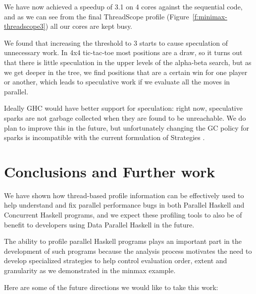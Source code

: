 \documentclass[twocolumn,9pt]{sigplanconf}
\let\cite=\citep
\begin{document}
We have now achieved a speedup of 3.1 on 4 cores against the
sequential code, and as we can see from the final ThreadScope profile
(Figure~\ref{f:minimax-threadscope3}) all our cores are kept busy.

We found that increasing the threshold to 3 starts to cause
speculation of unnecessary work.  In 4x4 tic-tac-toe most positions
are a draw, so it turns out that there is little speculation in the
upper levels of the alpha-beta search, but as we get deeper in the
tree, we find positions that are a certain win for one player or
another, which leads to speculative work if we evaluate all the moves
in parallel.  

Ideally GHC would have better support for speculation: right now,
speculative sparks are not garbage collected when they are found to be
unreachable.  We do plan to improve this in the future, but
unfortunately changing the GC policy for sparks is incompatible with
the current formulation of Strategies \cite{multicore-ghc}.







\section{Conclusions and Further work}
\label{s:conclusion}
We have shown how thread-based profile information can be effectively
used to help understand and fix parallel performance bugs in both
Parallel Haskell and Concurrent Haskell programs, and we expect these
profiling tools to also be of benefit to developers using Data
Parallel Haskell in the future.

The ability to profile parallel Haskell programs plays an important
part in the development of such programs because the analysis
process motivates the need to develop specialized strategies to
help control evaluation order, extent and granularity as we demonstrated in
the minmax example.

Here are some of the future directions we would like to take this
work:
\end{document}
